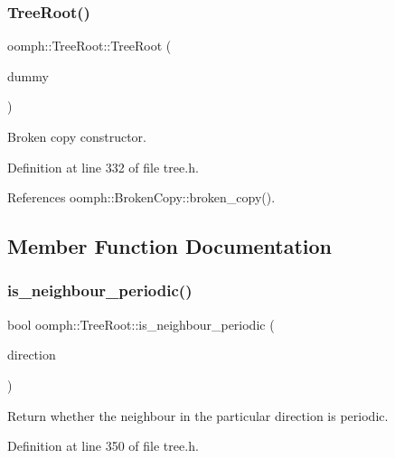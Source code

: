 \subsubsection{\texorpdfstring{Tree\+Root()}{TreeRoot()}\hspace{0.1cm}{\footnotesize\ttfamily [2/2]}}
{\footnotesize\ttfamily oomph\+::\+Tree\+Root\+::\+Tree\+Root (\begin{DoxyParamCaption}\item[{const \hyperlink{classoomph_1_1TreeRoot}{Tree\+Root} \&}]{dummy }\end{DoxyParamCaption})\hspace{0.3cm}{\ttfamily [inline]}}



Broken copy constructor. 



Definition at line 332 of file tree.\+h.



References oomph\+::\+Broken\+Copy\+::broken\+\_\+copy().



\subsection{Member Function Documentation}
\mbox{\label{classoomph_1_1TreeRoot_a7be347e54e34f924c008c302f5146064}} 
\subsubsection{\texorpdfstring{is\+\_\+neighbour\+\_\+periodic()}{is\_neighbour\_periodic()}}
{\footnotesize\ttfamily bool oomph\+::\+Tree\+Root\+::is\+\_\+neighbour\+\_\+periodic (\begin{DoxyParamCaption}\item[{const int \&}]{direction }\end{DoxyParamCaption})\hspace{0.3cm}{\ttfamily [inline]}}



Return whether the neighbour in the particular direction is periodic. 



Definition at line 350 of file tree.\+h.



